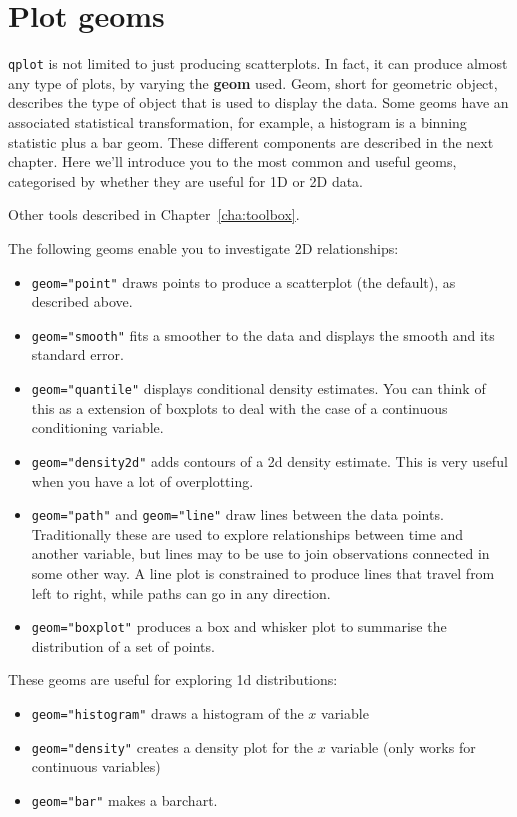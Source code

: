 \section{Plot geoms}\label{sec:plot_geoms}

{\tt qplot} is not limited to just producing scatterplots.  In fact, it can produce almost any type of plots, by varying the {\bf geom} used. Geom, short for geometric object, describes the type of object that is used to display the data.  Some geoms have an associated statistical transformation, for example, a histogram is a binning statistic plus a bar geom.  These different components are described in the next chapter.  Here we'll introduce you to the most common and useful geoms, categorised by whether they are useful for 1D or 2D data.

Other tools described in Chapter~\ref{cha:toolbox}.

The following geoms enable you to investigate 2D relationships:

\begin{itemize}
	\item {\tt geom="point"} draws points to produce a scatterplot (the default), as described above.
	\item {\tt geom="smooth"} fits a smoother to the data and displays the smooth and its standard error.
	\item {\tt geom="quantile"} displays conditional density estimates.  You can think of this as a extension of boxplots to deal with the case of a continuous conditioning variable.
	\item {\tt geom="density2d"} adds contours of a 2d density estimate.  This is very useful when you have a lot of overplotting.
	\item {\tt geom="path"} and {\tt geom="line"} draw lines between the data points.  Traditionally these are used to explore relationships between time and another variable, but lines may to be use to join observations connected in some other way.  A line plot is constrained to produce lines that travel from left to right, while paths can go in any direction.
	\item {\tt geom="boxplot"} produces a box and whisker plot to summarise the distribution of a set of points.
\end{itemize}

These geoms are useful for exploring 1d distributions:

\begin{itemize}
	\item {\tt geom="histogram"} draws a histogram of the $x$ variable 
	\item {\tt geom="density"} creates a density plot for the $x$ variable (only works for continuous variables)
  \item {\tt geom="bar"} makes a barchart.
\end{itemize}

